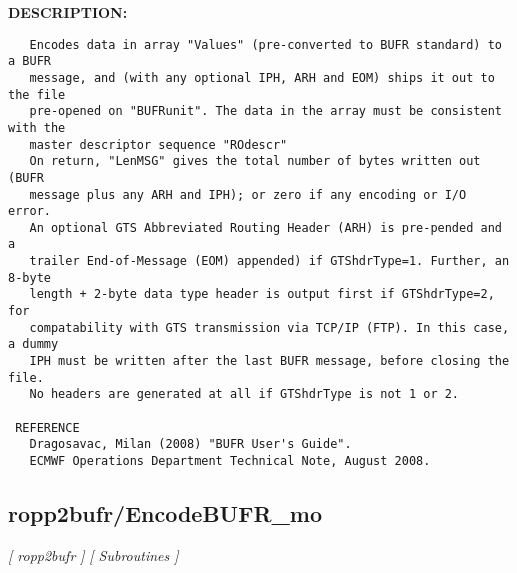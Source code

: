 \textbf{DESCRIPTION:}\hspace{0.08in}\begin{Verbatim}
   Encodes data in array "Values" (pre-converted to BUFR standard) to a BUFR
   message, and (with any optional IPH, ARH and EOM) ships it out to the file
   pre-opened on "BUFRunit". The data in the array must be consistent with the
   master descriptor sequence "ROdescr"
   On return, "LenMSG" gives the total number of bytes written out (BUFR
   message plus any ARH and IPH); or zero if any encoding or I/O error.
   An optional GTS Abbreviated Routing Header (ARH) is pre-pended and a
   trailer End-of-Message (EOM) appended) if GTShdrType=1. Further, an 8-byte
   length + 2-byte data type header is output first if GTShdrType=2, for
   compatability with GTS transmission via TCP/IP (FTP). In this case, a dummy
   IPH must be written after the last BUFR message, before closing the file.
   No headers are generated at all if GTShdrType is not 1 or 2.

 REFERENCE
   Dragosavac, Milan (2008) "BUFR User's Guide".
   ECMWF Operations Department Technical Note, August 2008.
\end{Verbatim}
\subsection{ropp2bufr/EncodeBUFR\_mo}
\textsl{[ ropp2bufr ]}
\textsl{[ Subroutines ]}

